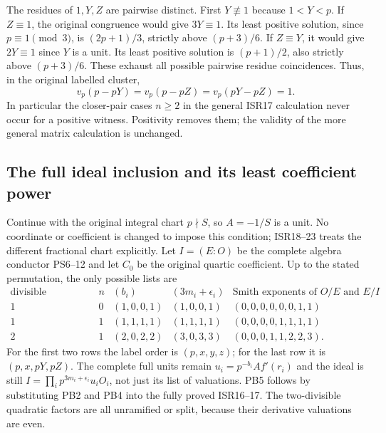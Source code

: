 The residues of $1,Y,Z$ are pairwise distinct. First $Y\not\equiv1$
because $1<Y<p$. If $Z\equiv1$, the original congruence would give
$3Y\equiv1$. Its least positive solution, since $p\equiv1\pmod3$,
is $(2p+1)/3$, strictly above $(p+3)/6$. If $Z\equiv Y$, it would
give $2Y\equiv1$ since $Y$ is a unit. Its least positive solution
is $(p+1)/2$, also strictly above $(p+3)/6$. These exhaust all possible
pairwise residue coincidences. Thus, in the original labelled cluster,
\[
 v_p(p-pY)=v_p(p-pZ)=v_p(pY-pZ)=1.
 \tag{PB4}
\]
In particular the closer-pair cases $n\ge2$ in the general ISR17
calculation never occur for a positive witness. Positivity removes them;
the validity of the more general matrix calculation is unchanged.

\subsection{The full ideal inclusion and its least coefficient power}
Continue with the original integral chart $p\nmid S$, so $A=-1/S$
is a unit. No coordinate or coefficient is changed to impose this
condition; ISR18--23 treats the different fractional chart explicitly.
Let $I=(E:O)$ be the complete algebra conductor PS6--12 and let $C_0$
be the original quartic coefficient. Up to the stated permutation,
the only possible lists are
\[
\begin{array}{c|c|c|c|c}
 \text{divisible denominators}&n&(b_i)&(3m_i+\epsilon_i)&
              \text{Smith exponents of }O/E\text{ and }E/I\\\hline
 1&0&(1,0,0,1)&(1,0,0,1)&(0,0,0,0,0,0,1,1)\\
 1&1&(1,1,1,1)&(1,1,1,1)&(0,0,0,0,1,1,1,1)\\
 2&1&(2,0,2,2)&(3,0,3,3)&(0,0,0,1,1,2,2,3).
\end{array}\tag{PB5}
\]
For the first two rows the label order is $(p,x,y,z)$; for the last
row it is $(p,x,pY,pZ)$. The complete full units remain
$u_i=p^{-b_i}Af'(r_i)$ and the ideal is still
$I=\prod_i p^{3m_i+\epsilon_i}u_iO_i$, not just its list of valuations.
PB5 follows by substituting PB2 and PB4 into the fully proved ISR16--17.
The two-divisible quadratic factors are all unramified or split,
because their derivative valuations are even.

